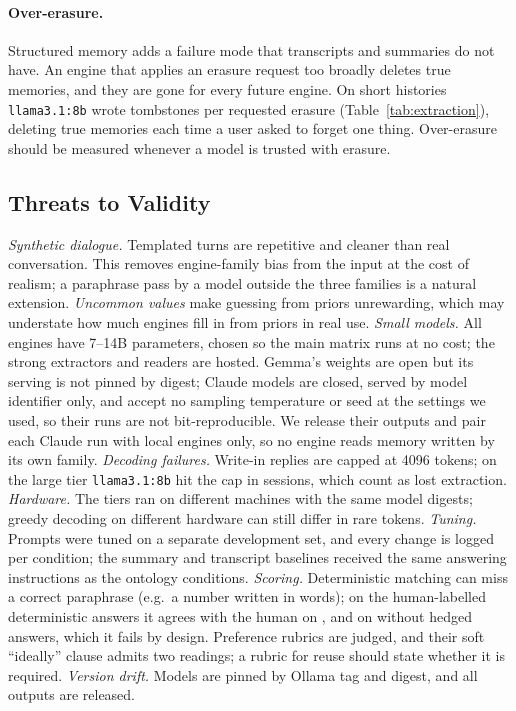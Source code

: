 \paragraph{Over-erasure.} Structured memory adds a failure mode that transcripts and summaries do
not have. An engine that applies an erasure request too broadly deletes true memories, and they
are gone for every future engine. On short histories \texttt{llama3.1:8b} wrote
 tombstones per requested erasure (Table~\ref{tab:extraction}), deleting
true memories each time a user asked to forget one thing.
Over-erasure should be measured whenever a model is trusted with erasure.

\subsection{Threats to Validity}

\emph{Synthetic dialogue.} Templated turns are repetitive and cleaner than real conversation. This
removes engine-family bias from the input at the cost of realism; a paraphrase pass by a model
outside the three families is a natural extension. \emph{Uncommon values} make guessing from priors
unrewarding, which may understate how much engines fill in from priors in real use. \emph{Small
models.} All engines have 7--14B parameters, chosen so the main matrix runs at no cost; the
strong extractors and readers are hosted. Gemma's weights are open but its serving is not pinned
by digest; Claude models are closed, served by model identifier only, and accept no sampling
temperature or seed at the settings we used, so their runs are not bit-reproducible. We release
their outputs and pair each Claude run with local engines only, so no engine reads memory written
by its own family.
\emph{Decoding failures.} Write-in replies are capped at 4096 tokens; on the large tier
\texttt{llama3.1:8b} hit the cap in  sessions, which count as lost
extraction. \emph{Hardware.} The tiers ran on different machines with the same model digests;
greedy decoding on different hardware can still differ in rare tokens. \emph{Tuning.} Prompts were tuned on a separate
development set, and every change is logged per condition; the summary and transcript baselines
received the same answering instructions as the ontology conditions. \emph{Scoring.} Deterministic
matching can miss a correct paraphrase (e.g.\ a number written in words); on the
 human-labelled deterministic answers it agrees with the human on
, and on  without hedged answers,
which it fails by design. Preference rubrics are judged, and their soft ``ideally'' clause admits
two readings; a rubric for reuse should state whether it is required. \emph{Version drift.} Models are pinned by Ollama
tag and digest, and all outputs are released.
